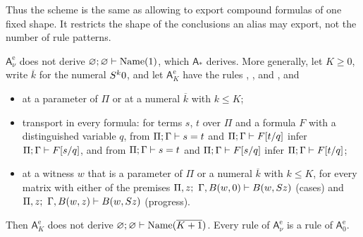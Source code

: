 Thus the scheme  is the same as allowing  to
export compound formulas of one fixed shape.  It restricts the shape of the
conclusions an alias may export, not the number of rule patterns.

\begin{theorem}
\label{wit:thm:ns-obstruction}
$\mathsf{A}^{\mathrm e}_{\nu}$ does not derive
$\varnothing;\varnothing\vdash\mathrm{Name}(1)$, which $\mathsf{A}_{\ast}$
derives.  More generally, let $K\ge 0$, write $\overline{k}$ for the numeral
$S^k0$, and let $\mathsf{A}^{\mathrm e}_{K}$ have the rules
, ,  and , and
\begin{itemize}
\item {} at a parameter of $\Pi$ or at a numeral $\overline{k}$
 with $k\le K$;
\item transport in every formula: for terms $s$, $t$ over $\Pi$ and a formula
 $F$ with a distinguished variable $q$, from $\Pi;\Gamma\vdash s=t$ and
 $\Pi;\Gamma\vdash F[t/q]$ infer $\Pi;\Gamma\vdash F[s/q]$, and
 from $\Pi;\Gamma\vdash s=t$ and $\Pi;\Gamma\vdash F[s/q]$ infer
 $\Pi;\Gamma\vdash F[t/q]$;
\item {} at a witness $w$ that is a parameter of $\Pi$ or a
 numeral $\overline{k}$ with $k\le K$, for every matrix with either of the
 premises $\Pi,z;\ \Gamma,B(w,0)\vdash B(w,S z)$ (cases) and
 $\Pi,z;\ \Gamma,B(w,z)\vdash B(w,S z)$ (progress).
\end{itemize}
Then $\mathsf{A}^{\mathrm e}_{K}$ does not derive
$\varnothing;\varnothing\vdash\mathrm{Name}(\overline{K+1})$.  Every rule of
$\mathsf{A}^{\mathrm e}_{\nu}$ is a rule of $\mathsf{A}^{\mathrm e}_{0}$.
\end{theorem}

